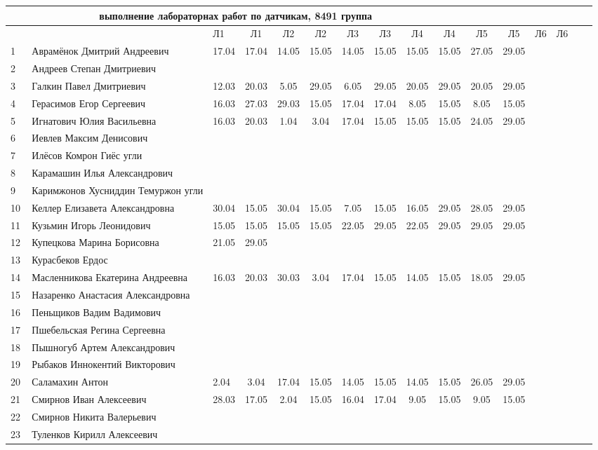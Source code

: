 \newpage
%
\begin{tabular}{l|llccccccccccccc}
\multicolumn{10}{c}{выполнение лабораторнах работ по датчикам, 8491 группа} \\
\toprule
&&Л1&Л1& Л2&Л2& Л3&Л3& Л4&Л4 &Л5&Л5& Л6&Л6\\
\midrule
	1\,&   Аврамёнок Дмитрий Андреевич        &17.04&17.04& 14.05 & 15.05& 14.05& 15.05& 15.05& 15.05& 27.05& 29.05\\
2\,&   Андреев Степан Дмитриевич          &&&&&&&&\\
	3\,&   Галкин Павел Дмитриевич            & 12.03& 20.03& 5.05& 29.05& 6.05& 29.05& 20.05 & 29.05& 20.05& 29.05\\
4\,&   Герасимов Егор Сергеевич           & 16.03& 27.03& 29.03& 15.05& 17.04& 17.04 & 8.05& 15.05 & 8.05& 15.05\\
	5\,&   Игнатович Юлия Васильевна          & 16.03& 20.03& 1.04& 3.04& 17.04& 15.05& 15.05& 15.05 & 24.05 & 29.05\\
\midrule
6\,&   Иевлев Максим Денисович            &&&&&&&&\\
7\,&   Илёсов Комрон Гиёс угли            &&&&&&&&\\
8\,&   Карамашин Илья Александрович       &&&&&&&&\\
9\,&   Каримжонов Хусниддин Темуржон угли &&&&&&&&\\
	10\,&  Келлер Елизавета Александровна     & 30.04& 15.05 &30.04& 15.05 & 7.05& 15.05&16.05& 29.05& 28.05 & 29.05\\
\midrule
	11\,&  Кузьмин Игорь Леонидович           &15.05 & 15.05& 15.05& 15.05& 22.05& 29.05& 22.05& 29.05 & 29.05 & 29.05\\
12\,&  Купецкова Марина Борисовна         &21.05& 29.05& &&&&&\\
13\,&  Курасбеков Ердос                   &&&&&&&&\\
	14\,&  Масленникова Екатерина Андреевна   & 16.03& 20.03&30.03& 3.04& 17.04& 15.05& 14.05& 15.05 & 18.05& 29.05\\
15\,&  Назаренко Анастасия Александровна  &&&&&&&&\\
\midrule
16\,&  Пеньщиков Вадим Вадимович          &&&&&&&&\\
17\,&  Пшебельская Регина Сергеевна       &&&&&&&&\\
18\,&  Пышногуб Артем Александрович       &&&&&&&&\\
19\,&  Рыбаков Иннокентий Викторович      &&&&&&&&\\
	20\,&  Саламахин Антон                    & 2.04& 3.04& 17.04& 15.05& 14.05& 15.05& 14.05& 15.05 & 26.05 & 29.05\\
\midrule
	21\,&  Смирнов Иван Алексеевич            &28.03&17.05& 2.04& 15.05 &16.04 & 17.04& 9.05& 15.05 & 9.05& 15.05\\
22\,&  Смирнов Никита Валерьевич          &&&&&&&&\\
23\,&  Туленков Кирилл Алексеевич         &&&&&&&&\\
\bottomrule
\end{tabular}

